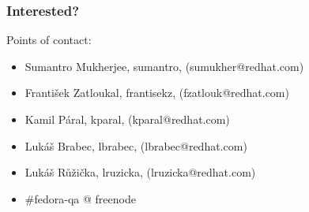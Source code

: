 \documentclass[12pt]{beamer}
\begin{document}
\begin{frame}
\frametitle{Interested?}

Points of contact:

\begin{itemize}
	\item Sumantro Mukherjee, sumantro, (sumukher@redhat.com)
	\item František Zatloukal, frantisekz, (fzatlouk@redhat.com)
	\item Kamil Páral, kparal, (kparal@redhat.com)
	\item Lukáš Brabec, lbrabec, (lbrabec@redhat.com)
	\item Lukáš Růžička, lruzicka, (lruzicka@redhat.com)
	\item \#fedora-qa @ freenode
\end{itemize}

\end{frame}
\end{document}
